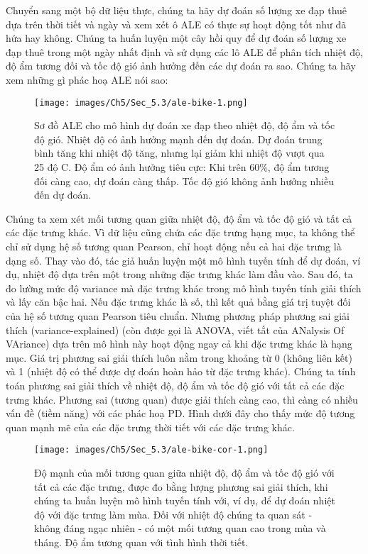 Chuyển sang một bộ dữ liệu thực, chúng ta hãy dự đoán số lượng xe đạp thuê dựa trên thời tiết và ngày và xem xét ô ALE có thực sự hoạt động tốt như đã hứa hay không. Chúng ta huấn luyện một cây hồi quy để dự đoán số lượng xe đạp thuê trong một ngày nhất định và sử dụng các lô ALE để phân tích nhiệt độ, độ ẩm tương đối và tốc độ gió ảnh hưởng đến các dự đoán ra sao. Chúng ta hãy xem những gì phác hoạ ALE nói sao:

\begin{figure*}[h!]
	\centering
	\texttt{[image: images/Ch5/Sec\_5.3/ale-bike-1.png]}
	\label{fig:5_16}
	\caption{Sơ đồ ALE cho mô hình dự đoán xe đạp theo nhiệt độ, độ ẩm và tốc độ gió. Nhiệt độ có ảnh hưởng mạnh đến dự đoán. Dự đoán trung bình tăng khi nhiệt độ tăng, nhưng lại giảm khi nhiệt độ vượt qua 25 độ C. Độ ẩm có ảnh hưởng tiêu cực: Khi trên 60\%, độ ẩm tương đối càng cao, dự đoán càng thấp. Tốc độ gió không ảnh hưởng nhiều đến dự đoán.}
\end{figure*}

Chúng ta xem xét mối tương quan giữa nhiệt độ, độ ẩm và tốc độ gió và tất cả các đặc trưng khác. Vì dữ liệu cũng chứa các đặc trưng hạng mục, ta không thể chỉ sử dụng hệ số tương quan Pearson, chỉ hoạt động nếu cả hai đặc trưng là dạng số. Thay vào đó, tác giả huấn luyện một mô hình tuyến tính để dự đoán, ví dụ, nhiệt độ dựa trên một trong những đặc trưng khác làm đầu vào. Sau đó, ta đo lường mức độ variance mà đặc trưng khác trong mô hình tuyến tính giải thích và lấy căn bậc hai. Nếu đặc trưng khác là số, thì kết quả bằng giá trị tuyệt đối của hệ số tương quan Pearson tiêu chuẩn. Nhưng phương pháp phương sai giải thích (variance-explained) (còn được gọi là ANOVA, viết tắt của ANalysis Of VAriance) dựa trên mô hình này hoạt động ngay cả khi đặc trưng khác là hạng mục. 
Giá trị phương sai giải thích luôn nằm trong khoảng từ 0 (không liên kết) và 1 (nhiệt độ có thể được dự đoán hoàn hảo từ đặc trưng khác). Chúng ta tính toán phương sai giải thích về nhiệt độ, độ ẩm và tốc độ gió với tất cả các đặc trưng khác. Phương sai (tương quan) được giải thích càng cao, thì càng có nhiều vấn đề (tiềm năng) với các phác hoạ PD. Hình dưới đây cho thấy mức độ tương quan mạnh mẽ của các đặc trưng thời tiết với các đặc trưng khác.

\begin{figure*}[h!]
	\centering
	\texttt{[image: images/Ch5/Sec\_5.3/ale-bike-cor-1.png]}
	\label{fig:5_17}
	\caption{Độ mạnh của mối tương quan giữa nhiệt độ, độ ẩm và tốc độ gió với tất cả các đặc trưng, được đo bằng lượng phương sai giải thích, khi chúng ta huấn luyện mô hình tuyến tính với, ví dụ, để dự đoán nhiệt độ với đặc trưng làm mùa. Đối với nhiệt độ chúng ta quan sát - không đáng ngạc nhiên - có một mối tương quan cao trong mùa và tháng. Độ ẩm tương quan với tình hình thời tiết.}
\end{figure*}

